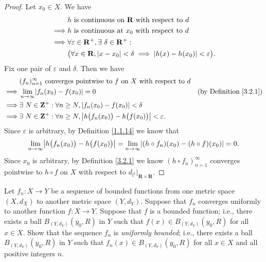 \begin{proof}
    Let \(x_0 \in X\).
    We have
    \begin{align*}
                 & h \text{ is continuous on } \mathbf{R} \text{ with respect to } d                                        \\
        \implies & h \text{ is continuous at } x_0 \text{ with respect to } d                                               \\
        \implies & \forall \varepsilon \in \mathbf{R}^+, \exists\ \delta \in \mathbf{R}^+ :                                 \\
                 & \big(\forall x \in \mathbf{R}, \abs*{x - x_0} < \delta \implies \abs*{h(x) - h(x_0)} < \varepsilon\big).
    \end{align*}
    Fix one pair of \(\varepsilon\) and \(\delta\).
    Then we have
    \begin{align*}
                 & (f_n)_{n = 1}^\infty \text{ converges pointwise to } f \text{ on } X \text{ with respect to } d                                                    \\
        \implies & \lim_{n \to \infty} \abs*{f_n(x_0) - f(x_0)} = 0                                                              & \text{(by Definition \ref{3.2.1})} \\
        \implies & \exists\ N \in \mathbf{Z}^+ : \forall n \geq N, \abs*{f_n(x_0) - f(x_0)} < \delta                                                                  \\
        \implies & \exists\ N \in \mathbf{Z}^+ : \forall n \geq N, \abs*{h\big(f_n(x_0)\big) - h\big(f(x_0)\big)} < \varepsilon.
    \end{align*}
    Since \(\varepsilon\) is arbitrary, by Definition \ref{1.1.14} we know that
    \[
        \lim_{n \to \infty} \abs*{h\big(f_n(x_0)\big) - h\big(f(x_0)\big)} = \lim_{n \to \infty} \abs*{(h \circ f_n)(x_0) - (h \circ f)(x_0)} = 0.
    \]
    Since \(x_0\) is arbitrary, by Definition \ref{3.2.1} we know \((h \circ f_n)_{n = 1}^\infty\) converges pointwise to \(h \circ f\) on \(X\) with respect to \(d_{l^1}|_{\mathbf{R} \times \mathbf{R}}\).
\end{proof}

\begin{exercise}\label{ex 3.2.4}
    Let \(f_n : X \to Y\) be a sequence of bounded functions from one metric space \((X, d_X)\) to another metric space \((Y, d_Y)\).
    Suppose that \(f_n\) converges uniformly to another function \(f : X \to Y\).
    Suppose that \(f\) is a bounded function;
    i.e., there exists a ball \(B_{(Y, d_Y)}(y_0, R)\) in \(Y\) such that \(f(x) \in B_{(Y, d_Y)}(y_0, R)\) for all \(x \in X\).
    Show that the sequence \(f_n\) is \emph{uniformly bounded};
    i.e., there exists a ball \(B_{(Y, d_Y)}(y_0, R)\) in \(Y\) such that \(f_n(x) \in B_{(Y, d_Y)}(y_0, R)\) for all \(x \in X\) and all positive integers \(n\).
\end{exercise}

